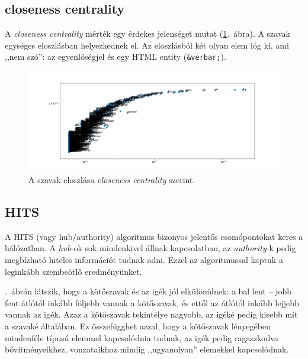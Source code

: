 \documentclass{llncs}
\newcommand{\embf}[1]{\textbf{#1}}
\newcommand{\liex}[1]{\emph{#1}}
\newcommand{\XXX}[1]{{\small \color{megjcolor} [XXX #1]}}
\begin{document}
\subsection{closeness centrality}

A \emph{closeness centrality} mérték egy érdekes jelenséget mutat
(\ref{fig:closeness}.\ ábra).
%
A szavak egységes eloszlásban helyezkednek el.
Az eloszlásból két olyan elem lóg ki, ami ,,nem szó'':
az egyenlőségjel és egy HTML entity ({\tt \&verbar;}).
%

\begin{figure}[h]
\begin{center}
\includegraphics[width=18cm]{current-flow-closeness.png}
\end{center}
\caption{A szavak eloszlása \emph{closeness centrality} szerint. 
\label{fig:closeness}}
\end{figure}

\subsection{HITS}
 
A HITS (vagy hub/authority) algoritmus bizonyos jelentős csomópontokat
keres a hálózatban. A \emph{hub}-ok sok mindenkivel állnak kapcsolatban,
az \emph{authority}-k pedig megbízható hiteles információt
tudnak adni.
%
Ezzel az algoritmussal kaptuk a leginkább szembeötlő eredményünket.

.\ ábrán látszik,
hogy a kötőszavak és az igék jól elkülönülnek:
a bal lent -- jobb fent átlótól inkább följebb vannak a kötőszavak,
és ettől az átlótól inkább lejjebb vannak az igék.
Azaz a kötőszavak tekintélye nagyobb,
az igéké pedig kisebb mit a szavaké általában.
%
Ez összefügghet azzal, hogy a kötőszavak
lényegében mindenféle típusú elemmel kapcsolódnia tudnak,
az igék pedig ragaszkodva bővítményeikhez, vonzataikhoz
mindig ,,ugyanolyan'' elemekkel kapcsolódnak.
\end{document}
